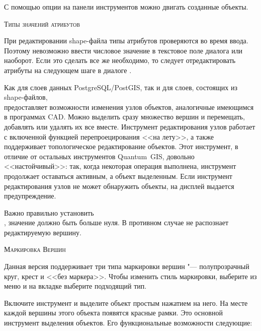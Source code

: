 С помощью опции  на
панели инструментов можно двигать созданные объекты.

\begin{Tip}\caption{\textsc{Типы значений атрибутов}}
При редактировании shape-файла типы атрибутов проверяются во время ввода.
Поэтому невозможно ввести числовое значение в текстовое поле диалога
 или наоборот. Если это сделать все же необходимо,
то следует отредактировать атрибуты на следующем шаге в диалоге
.
\end{Tip}


Как для слоев данных PostgreSQL/PostGIS, так и для слоев, состоящих из
shape-файлов, \\
 предоставляет
возможности изменения узлов объектов, аналогичные имеющимся в программах CAD.
Можно выделить сразу множество вершин и перемещать, добавлять или удалять
их все вместе. Инструмент редактирования узлов работает с включенной функцией
перепроецирования <<на лету>>, а также поддерживает топологическое редактирование
объектов. Этот инструмент, в отличие от остальных инструментов Quantum~GIS,
довольно <<настойчивый>>: так, когда некоторая операция выполнена, инструмент
продолжает оставаться активным, а объект выделенным. Если инструмент
редактирования узлов не может обнаружить объекты, на дисплей выдается
предупреждение.

Важно правильно установить  \arrow
{} \arrow
{} \arrow \\ , значение должно быть
больше нуля. В противном случае \qg не распознает редактируемую вершину.

\begin{Tip}\caption{\textsc{Маркировка Вершин}}
Данная версия \qg поддерживает три типа маркировки вершин "--- полупрозрачный
круг, крест и <<без маркера>>. Чтобы изменить стиль маркировки, выберите
 из меню 
и на вкладке  выберите подходящий тип.
\end{Tip}


Включите инструмент  и
выделите объект простым нажатием на него. На месте каждой вершины этого
объекта появятся красные рамки. Это основной инструмент выделения объектов.
Его функциональные возможности следующие:

